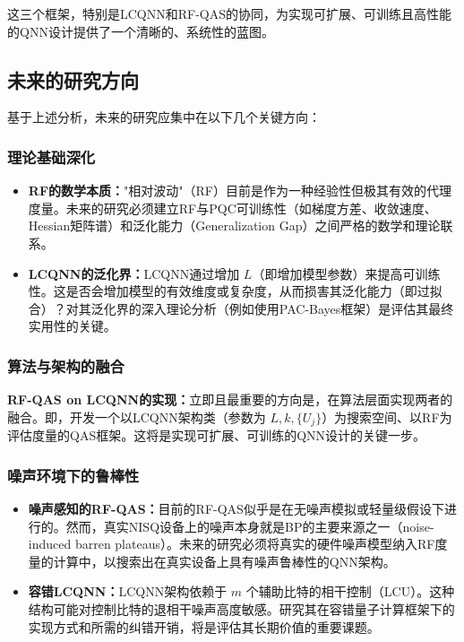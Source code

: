 \documentclass[12pt,a4paper]{article}
\begin{document}
这三个框架，特别是LCQNN和RF-QAS的协同，为实现可扩展、可训练且高性能的QNN设计提供了一个清晰的、系统性的蓝图。

\subsection{未来的研究方向}

基于上述分析，未来的研究应集中在以下几个关键方向：

\subsubsection{理论基础深化}

\begin{itemize}
\item \textbf{RF的数学本质：}"相对波动"（RF）目前是作为一种经验性但极其有效的代理度量。未来的研究必须建立RF与PQC可训练性（如梯度方差、收敛速度、Hessian矩阵谱）和泛化能力（Generalization Gap）之间严格的数学和理论联系。

\item \textbf{LCQNN的泛化界：}LCQNN通过增加 $L$（即增加模型参数）来提高可训练性。这是否会增加模型的有效维度或复杂度，从而损害其泛化能力（即过拟合）？对其泛化界的深入理论分析（例如使用PAC-Bayes框架）是评估其最终实用性的关键。
\end{itemize}

\subsubsection{算法与架构的融合}

\textbf{RF-QAS on LCQNN的实现：}立即且最重要的方向是，在算法层面实现两者的融合。即，开发一个以LCQNN架构类（参数为 $L, k, \{U_j\}$）为搜索空间、以RF为评估度量的QAS框架。这将是实现可扩展、可训练的QNN设计的关键一步。

\subsubsection{噪声环境下的鲁棒性}

\begin{itemize}
\item \textbf{噪声感知的RF-QAS：}目前的RF-QAS似乎是在无噪声模拟或轻量级假设下进行的。然而，真实NISQ设备上的噪声本身就是BP的主要来源之一（noise-induced barren plateaus）。未来的研究必须将真实的硬件噪声模型纳入RF度量的计算中，以搜索出在真实设备上具有噪声鲁棒性的QNN架构。

\item \textbf{容错LCQNN：}LCQNN架构依赖于 $m$ 个辅助比特的相干控制（LCU）。这种结构可能对控制比特的退相干噪声高度敏感。研究其在容错量子计算框架下的实现方式和所需的纠错开销，将是评估其长期价值的重要课题。
\end{itemize}
\end{document}
